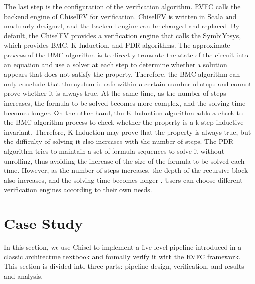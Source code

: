 \documentclass[conference]{IEEEtran}
\theoremstyle{definition}
\begin{document}
The last step is the configuration of the verification algorithm.
RVFC calls the backend engine of ChiselFV for verification. ChiselFV is written in Scala and modularly designed, and the backend engine can be changed and replaced.
By default, the ChiselFV provides a verification engine that calls the SymbiYosys, which provides BMC, K-Induction, and PDR algorithms.
The approximate process of the BMC algorithm is to directly translate the state of the circuit into an equation and use a solver at each step to determine whether a solution appears that does not satisfy the property.
Therefore, the BMC algorithm can only conclude that the system is safe within a certain number of steps and cannot prove whether it is always true.
At the same time, as the number of steps increases, the formula to be solved becomes more complex, and the solving time becomes longer.
On the other hand, the K-Induction algorithm adds a check to the BMC algorithm process to check whether the property is a k-step inductive invariant.
Therefore, K-Induction may prove that the property is always true, but the difficulty of solving it also increases with the number of steps.
The PDR algorithm tries to maintain a set of formula sequences to solve it without unrolling, thus avoiding the increase of the size of the formula to be solved each time.
However, as the number of steps increases, the depth of the recursive block also increases, and the solving time becomes longer \cite{vizel2015boolean}.
Users can choose different verification engines according to their own needs.

\section{Case Study}
In this section, we use Chisel to implement a five-level pipeline introduced in a classic architecture textbook \cite{patterson2017computer} and formally verify it with the RVFC framework.
This section is divided into three parts: pipeline design, verification, and results and analysis.
\end{document}
